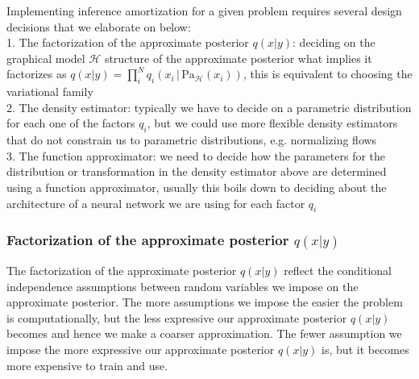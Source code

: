 \documentclass[12pt]{article}
\begin{document}
Implementing inference amortization for a given problem requires several design decisions that we elaborate on below:\\
1. The factorization of the approximate posterior $q(x|y)$: deciding on the graphical model $\mathcal{H}$ structure of the approximate posterior what implies it factorizes as $q(x|y)=\prod^N_iq_i(x_i\,|\,\text{Pa}_\mathcal{H}(x_i))$, this is equivalent to choosing the variational family\\
2. The density estimator: typically we have to decide on a parametric distribution for each one of the factors $q_i$, but we could use more flexible density estimators that do not constrain us to parametric distributions, e.g. normalizing flows \citep{RezendeMohamed2015} \\
3. The function approximator: we need to decide how the parameters for the distribution or transformation in the density estimator above are determined using a function approximator, usually this boils down to deciding about the architecture of a neural network we are using for each factor $q_i$\\




\subsubsection*{Factorization of the approximate posterior $q(x|y)$}
The factorization of the approximate posterior $q(x|y)$ reflect the conditional independence assumptions between random variables we impose on the approximate posterior.
The more assumptions we impose the easier the problem is computationally, but the less expressive our approximate posterior $q(x|y)$ becomes and hence we make a coarser approximation.
The fewer assumption we impose the more expressive our approximate posterior $q(x|y)$ is, but it becomes more expensive to train and use.
\end{document}

